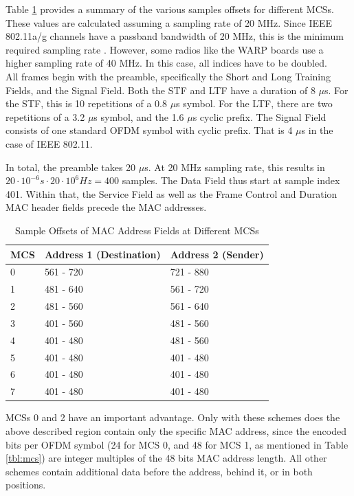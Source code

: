 Table \ref{tbl:sample-offsets} provides a summary of the various samples offsets for different \glspl{MCS}. These values are calculated assuming a sampling rate of 20 MHz. Since IEEE 802.11a/g channels have a passband bandwidth of 20 MHz, this is the minimum required sampling rate \cite{ieee2012}. However, some radios like the \gls{WARP} boards use a higher sampling rate of 40 MHz. In this case, all indices have to be doubled.\\

All frames begin with the preamble, specifically the Short and Long Training Fields, and the Signal Field. Both the \gls{STF} and \gls{LTF} have a duration of 8 $\mu$s. For the \gls{STF}, this is 10 repetitions of a 0.8 $\mu$s symbol. For the \gls{LTF}, there are two repetitions of a 3.2 $\mu$s symbol, and the 1.6 $\mu$s cyclic prefix. The Signal Field consists of one standard \gls{OFDM} symbol with cyclic prefix. That is 4 $\mu$s in the case of IEEE 802.11.

In total, the preamble takes 20 $\mu$s. At 20 MHz sampling rate, this results in $ 20 \cdot 10^{-6} s \cdot 20 \cdot 10^6 Hz= 400 $ samples. The Data Field thus start at sample index 401. Within that, the Service Field as well as the Frame Control and Duration \gls{MAC} header fields precede the \gls{MAC} addresses.\\

\begin{table}[ht]
	\centering
	\begin{tabular}{|p{2.5cm}|p{4.5cm}|p{4.5cm}|}
		\hline
		\textbf{MCS} & \textbf{Address 1 (Destination)} & \textbf{Address 2 (Sender)} \\ \hline
		0 & 561 - 720 & 721 - 880 \\ \hline
		1 & 481 - 640 & 561 - 720 \\ \hline
		2 & 481 - 560 & 561 - 640 \\ \hline
		3 & 401 - 560 & 481 - 560 \\ \hline
		4 & 401 - 480 & 481 - 560 \\ \hline
		5 & 401 - 480 & 401 - 480 \\ \hline
		6 & 401 - 480 & 401 - 480 \\ \hline
		7 & 401 - 480 & 401 - 480 \\ \hline
	\end{tabular}
	\caption{Sample Offsets of MAC Address Fields at Different MCSs}
	\label{tbl:sample-offsets}
\end{table}

\glspl{MCS} 0 and 2 have an important advantage. Only with these schemes does the above described region contain only the specific \gls{MAC} address, since the encoded bits per \gls{OFDM} symbol (24 for \gls{MCS} 0, and 48 for \gls{MCS} 1, as mentioned in Table \ref{tbl:mcs}) are integer multiples of the 48 bits \gls{MAC} address length. All other schemes contain additional data before the address, behind it, or in both positions.


